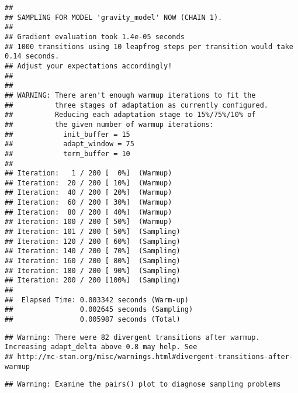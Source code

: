 \documentclass[11pt,]{article}
\newenvironment{Shaded}{\begin{snugshade}}{\end{snugshade}}
\newcommand{\KeywordTok}[1]{\textcolor[rgb]{0.13,0.29,0.53}{\textbf{#1}}}
\newcommand{\DataTypeTok}[1]{\textcolor[rgb]{0.13,0.29,0.53}{#1}}
\newcommand{\DecValTok}[1]{\textcolor[rgb]{0.00,0.00,0.81}{#1}}
\newcommand{\StringTok}[1]{\textcolor[rgb]{0.31,0.60,0.02}{#1}}
\newcommand{\NormalTok}[1]{#1}
\begin{document}
\begin{Shaded}
\begin{Highlighting}[]
{{\NormalTok{fit1 <-}\StringTok{ }\KeywordTok{stan}\NormalTok{( }\DataTypeTok{file =}\NormalTok{ model_file,}
 \DataTypeTok{data =}\NormalTok{ standata,}
 \DataTypeTok{chains =} \DecValTok{1}\NormalTok{,}
 \DataTypeTok{warmup =} \DecValTok{100}\NormalTok{,}
 \DataTypeTok{iter =} \DecValTok{200}\NormalTok{,}
 \DataTypeTok{cores =} \DecValTok{2}\NormalTok{)}
\end{Highlighting}
\end{Shaded}

\begin{verbatim}
## 
## SAMPLING FOR MODEL 'gravity_model' NOW (CHAIN 1).
## 
## Gradient evaluation took 1.4e-05 seconds
## 1000 transitions using 10 leapfrog steps per transition would take 0.14 seconds.
## Adjust your expectations accordingly!
## 
## 
## WARNING: There aren't enough warmup iterations to fit the
##          three stages of adaptation as currently configured.
##          Reducing each adaptation stage to 15%/75%/10% of
##          the given number of warmup iterations:
##            init_buffer = 15
##            adapt_window = 75
##            term_buffer = 10
## 
## Iteration:   1 / 200 [  0%]  (Warmup)
## Iteration:  20 / 200 [ 10%]  (Warmup)
## Iteration:  40 / 200 [ 20%]  (Warmup)
## Iteration:  60 / 200 [ 30%]  (Warmup)
## Iteration:  80 / 200 [ 40%]  (Warmup)
## Iteration: 100 / 200 [ 50%]  (Warmup)
## Iteration: 101 / 200 [ 50%]  (Sampling)
## Iteration: 120 / 200 [ 60%]  (Sampling)
## Iteration: 140 / 200 [ 70%]  (Sampling)
## Iteration: 160 / 200 [ 80%]  (Sampling)
## Iteration: 180 / 200 [ 90%]  (Sampling)
## Iteration: 200 / 200 [100%]  (Sampling)
## 
##  Elapsed Time: 0.003342 seconds (Warm-up)
##                0.002645 seconds (Sampling)
##                0.005987 seconds (Total)
\end{verbatim}

\begin{verbatim}
## Warning: There were 82 divergent transitions after warmup. Increasing adapt_delta above 0.8 may help. See
## http://mc-stan.org/misc/warnings.html#divergent-transitions-after-warmup
\end{verbatim}

\begin{verbatim}
## Warning: Examine the pairs() plot to diagnose sampling problems
\end{verbatim}
\end{document}
